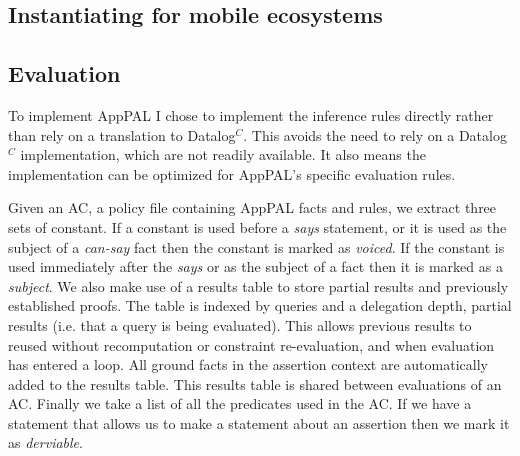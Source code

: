 \documentclass[thesis.tex]{subfiles}
\begin{document}
\subsection{Instantiating for mobile ecosystems}
\label{ssec:instantiating}

\subsection{Evaluation}
\label{ssec:evaluation-alg}

To implement AppPAL I chose to implement the inference rules directly rather than rely on a translation to Datalog$^C$.
This avoids the need to rely on a Datalog$^C$ implementation, which are not readily available.
It also means the implementation can be optimized for AppPAL's specific evaluation rules.

Given an \ac{AC}, a policy file containing AppPAL facts and rules, we extract three sets of constant.
If a constant is used before a \emph{says} statement, or it is used as the subject of a \emph{can-say} fact then the constant is marked as \emph{voiced}.  
If the constant is used immediately after the \emph{says} or as the subject of a fact then it is marked as a \emph{subject}.
We also make use of a results table to store partial results and previously established proofs.
The table is indexed by queries and a delegation depth, partial results (i.e. that a query is being evaluated).
This allows previous results to reused without recomputation or constraint re-evaluation, and when evaluation has entered a loop.
All ground facts in the assertion context are automatically added to the results table.
This results table is shared between evaluations of an \ac{AC}.
Finally we take a list of all the predicates used in the \ac{AC}.
If we have a statement that allows us to make a statement about an assertion then we mark it as \emph{derviable}.
\end{document}
